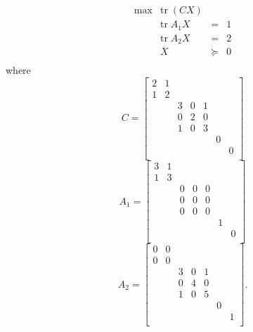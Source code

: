 \documentclass{article}
\begin{document}
\begin{equation}
\begin{array}{rrcl}
\max  & \mbox{tr}\; (CX)  & & \\
      & \mbox{tr}\;A_{1}X & = & 1 \\
      & \mbox{tr}\;A_{2}X & = & 2 \\
      & X                   & \succeq & 0 \\
\end{array}
\end{equation}
where 
\begin{equation}
C=\left[
\begin{array}{rrrrrrr}
 2 &  1 &   &   &   &   &    \\ 
 1 &  2 &   &   &   &   &    \\ 
   &    & 3 & 0 & 1 &   &    \\ 
   &    & 0 & 2 & 0 &   &    \\ 
   &    & 1 & 0 & 3 &   &    \\ 
   &    &   &   &   & 0 &    \\ 
   &    &   &   &   &   & 0  \\ 
\end{array}
\right]
\end{equation}
\begin{equation}
A_{1}=\left[
\begin{array}{rrrrrrr}
 3 &  1 &   &   &   &   &    \\ 
 1 &  3 &   &   &   &   &    \\ 
   &    & 0 & 0 & 0 &   &    \\ 
   &    & 0 & 0 & 0 &   &    \\ 
   &    & 0 & 0 & 0 &   &    \\ 
   &    &   &   &   & 1 &    \\ 
   &    &   &   &   &   & 0  \\ 
\end{array}
\right]
\end{equation}
\begin{equation}
A_{2}=\left[
\begin{array}{rrrrrrr}
 0 &  0 &   &   &   &   &    \\ 
 0 &  0 &   &   &   &   &    \\ 
   &    & 3 & 0 & 1 &   &    \\ 
   &    & 0 & 4 & 0 &   &    \\ 
   &    & 1 & 0 & 5 &   &    \\ 
   &    &   &   &   & 0 &    \\ 
   &    &   &   &   &   & 1  \\ 
\end{array}
\right].
\end{equation}
\end{document}
